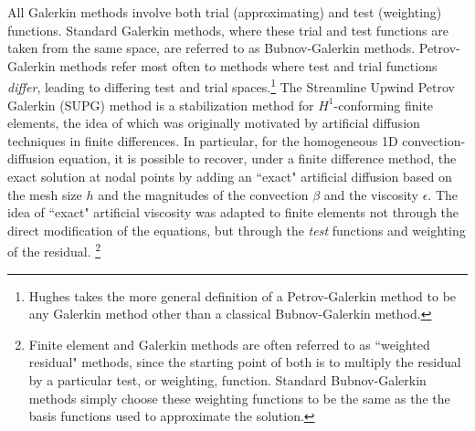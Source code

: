 All Galerkin methods involve both trial (approximating) and test (weighting) functions.   Standard Galerkin methods, where these trial and test functions are taken from the same space, are referred to as Bubnov-Galerkin methods.  Petrov-Galerkin methods refer most often to methods where test and trial functions \emph{differ}, leading to differing test and trial spaces.\footnote{Hughes takes the more general definition of a Petrov-Galerkin method to be any Galerkin method other than a classical Bubnov-Galerkin method.}  The Streamline Upwind Petrov Galerkin (SUPG) method is a stabilization method for $H^1$-conforming finite elements, the idea of which was originally motivated by artificial diffusion techniques in finite differences.  In particular, for the homogeneous 1D convection-diffusion equation, it is possible to recover, under a finite difference method, the exact solution at nodal points by adding an ``exact" artificial diffusion based on the mesh size $h$ and the magnitudes of the convection $\beta$ and the viscosity $\epsilon$.  The idea of ``exact" artificial viscosity was adapted to finite elements not through the direct modification of the equations, but through the \emph{test} functions and weighting of the residual. \footnote{Finite element and Galerkin methods are often referred to as ``weighted residual" methods, since the starting point of both is to multiply the residual by a particular test, or weighting, function.  Standard Bubnov-Galerkin methods simply choose these weighting functions to be the same as the the basis functions used to approximate the solution.  }

